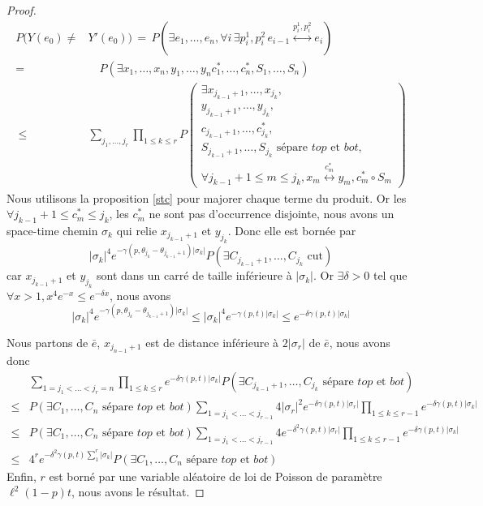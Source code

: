 \documentclass[titlepage,a4paper,12pt]{article}
\newcounter{prop}
\begin{document}
\begin{proof}
\begin{align*}
P(Y(e_0)\neq& Y'(e_0)) \,=\, P(\exists e_1,\dots,e_n, \forall i\, \exists p_i^1,p_i^2\, e_{i-1}\overset{p_i^1,p_i^2}{\longleftrightarrow}e_i) \\
 =&\quad P(\exists x_1,\dots,x_n,y_1,\dots,y_n c^*_1,\dots,c^*_n,S_1,\dots,S_n) \\\
 \leqslant &\sum_{j_1,\dots,j_r}\prod_{1\leqslant k \leqslant r} P\left(\begin{array}{c}
 \exists x_{j_{k-1}+1},\dots,x_{j_k},\\
 y_{j_{k-1}+1},\dots,y_{j_k},\\
 c_{j_{k-1}+1},\dots,c^*_{j_k},\\
 S_{j_{k-1}+1},\dots,S_{j_k} \text{ sépare } top \text{ et }bot,\\
 \forall j_{k-1}+1 \leqslant m \leqslant j_k, x_m\overset{c^*_m}{\longleftrightarrow} y_m, 
 c^*_m\circ S_m
 \end{array}
 \right)
\end{align*}
Nous utilisons la proposition \ref{stc} pour majorer chaque terme du produit. Or les $\forall j_{k-1}+1 \leqslant c^*_m \leqslant j_k$, les $c^*_m$ ne sont pas d'occurrence disjointe, nous avons un space-time chemin $\sigma_k$ qui relie $x_{j_{k-1}+1}$ et $y_{j_k}$. Donc elle est bornée par $$ \displaystyle |\sigma_k|^4 e^{-\gamma(p,\theta_{j_k}-\theta_{j_{k-1}+1})|\sigma_k|} P(\exists C_{j_{k-1}+1},\dots,C_{j_k} \text{ cut})$$ car $x_{j_{k-1}+1}$ et $y_{j_k}$ sont dans un carré de taille inférieure à $ |\sigma_k|$. Or $\exists \delta>0$ tel que $\forall x>1, x^4e^{-x} \leqslant e^{-\delta x}$, nous avons 
$$|\sigma_k|^4 e^{-\gamma(p,\theta_{j_k}-\theta_{j_{k-1}+1})|\sigma_k|} \leqslant |\sigma_k|^4 e^{-\gamma(p,t)|\sigma_k|} \leqslant e^{-\delta\gamma(p,t)|\sigma_k|}$$

Nous partons de $\bar{e}$, $x_{j_{n-1}+1}$ est de distance inférieure à $2|\sigma_r|$ de $\bar{e}$, nous avons donc 
\begin{align*}&\sum_{1=j_1<\dots < j_r = n} \prod_{1\leqslant k \leqslant r} e^{-\delta \gamma(p,t)|\sigma_k|} P(\exists C_{j_{k-1}+1},\dots,C_{j_k} \text{ sépare }top \text{ et }bot) \\
\leqslant & P(\exists C_1,\dots,C_n \text{ sépare }top \text{ et }bot)\sum_{1=j_1<\dots < j_{r-1}} 4|\sigma_r|^2e^{-\delta \gamma(p,t)|\sigma_r|}\prod_{1\leqslant k \leqslant r-1}e^{-\delta \gamma(p,t)|\sigma_k|} \\
\leqslant & P(\exists C_1,\dots,C_n \text{ sépare }top \text{ et }bot)\sum_{1=j_1<\dots < j_{r-1}} 4e^{-\delta^2 \gamma(p,t)|\sigma_r|}\prod_{1\leqslant k \leqslant r-1}e^{-\delta \gamma(p,t)|\sigma_k|} \\
\leqslant & 4^r e^{-\delta^2 \gamma(p,t)\sum_1^r|\sigma_k|}P(\exists C_1,\dots,C_n \text{ sépare }top \text{ et }bot)
\end{align*}
Enfin, $r$ est borné par une variable aléatoire de loi de Poisson de paramètre $\ell^2 (1-p) t$, nous avons le résultat.
\end{proof}
\end{document}

